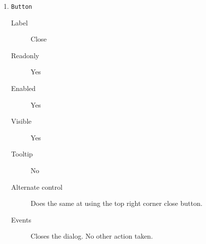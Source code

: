 \begin{enumerate}
    \item \texttt{Button}
              \begin{description}
                  \item[Label] Close
                  \item[Readonly] Yes
                  \item[Enabled] Yes
                  \item[Visible] Yes
                  \item[Tooltip] No
                  \item[Alternate control] Does the same at using the top right
                                           corner close button.
                  \item[Events] Closes the dialog. No other action taken.
              \end{description}

\end{enumerate}

